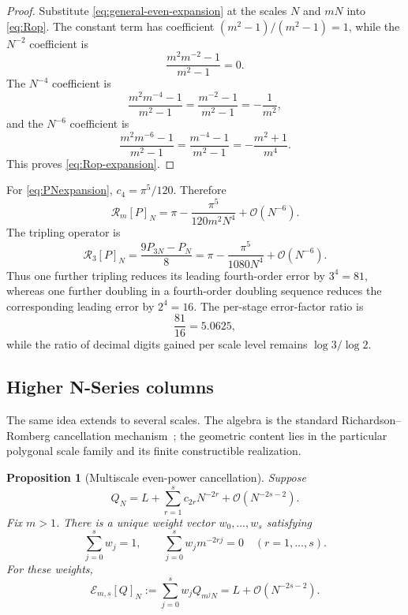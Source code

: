 \documentclass[12pt]{article}
\newtheorem{proposition}[theorem]{Proposition}
\theoremstyle{definition}
\theoremstyle{remark}
\newcommand{\Rop}{\mathcal{R}}
\newcommand{\Rmulti}{\mathcal{E}}
\newcommand{\Order}{\mathcal{O}}
\begin{document}
\begin{proof}
Substitute \eqref{eq:general-even-expansion} at the scales $N$ and $mN$ into
\eqref{eq:Rop}.  The constant term has coefficient
$(m^2-1)/(m^2-1)=1$, while the $N^{-2}$ coefficient is
\[
  \frac{m^2m^{-2}-1}{m^2-1}=0.
\]
The $N^{-4}$ coefficient is
\[
  \frac{m^2m^{-4}-1}{m^2-1}
  =\frac{m^{-2}-1}{m^2-1}
  =-\frac1{m^2},
\]
and the $N^{-6}$ coefficient is
\[
  \frac{m^2m^{-6}-1}{m^2-1}
  =\frac{m^{-4}-1}{m^2-1}
  =-\frac{m^2+1}{m^4}.
\]
This proves \eqref{eq:Rop-expansion}.
\end{proof}

For \eqref{eq:PNexpansion}, $c_4=\pi^5/120$.  Therefore
\begin{equation}
  \Rop_m[P]_N
  =\pi-\frac{\pi^5}{120m^2N^4}+\Order(N^{-6}).
  \label{eq:Rop-P}
\end{equation}
The tripling operator is
\begin{equation}
  \Rop_3[P]_N=\frac{9P_{3N}-P_N}{8}
             =\pi-\frac{\pi^5}{1080N^4}+\Order(N^{-6}).
  \label{eq:R3}
\end{equation}
Thus one further tripling reduces its leading fourth-order error by
$3^4=81$, whereas one further doubling in a fourth-order doubling sequence
reduces the corresponding leading error by $2^4=16$.  The per-stage
error-factor ratio is
\[
  \frac{81}{16}=5.0625,
\]
while the ratio of decimal digits gained per scale level remains
$\log 3/\log 2$.

\subsection{Higher N-Series columns}

The same idea extends to several scales.  The algebra is the standard
Richardson--Romberg cancellation mechanism~\cite{richardson-gaunt,romberg}; the
geometric content lies in the particular polygonal scale family and its finite
constructible realization.

\begin{proposition}[Multiscale even-power cancellation]
Suppose
\begin{equation}
  Q_N=L+\sum_{r=1}^{s}c_{2r}N^{-2r}
      +\Order(N^{-2s-2}).
  \label{eq:multi-expansion}
\end{equation}
Fix $m>1$.  There is a unique weight vector
$w_0,\ldots,w_s$ satisfying
\begin{equation}
  \sum_{j=0}^{s}w_j=1,
  \qquad
  \sum_{j=0}^{s}w_jm^{-2rj}=0
  \quad (r=1,\ldots,s).
  \label{eq:moment-conditions}
\end{equation}
For these weights,
\begin{equation}
  \Rmulti_{m,s}[Q]_N
  :=\sum_{j=0}^{s}w_jQ_{m^jN}
  =L+\Order(N^{-2s-2}).
  \label{eq:multi-operator}
\end{equation}
\end{proposition}
\end{document}
